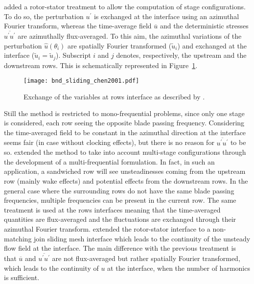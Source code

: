\citet{Chen2001} added a rotor-stator treatment
to allow the computation of stage configurations. 
To do so, the perturbation 
$u^\prime$ is exchanged at the interface using
an azimuthal Fourier transform, whereas
the time-average field $\overline{u}$ 
and the deterministic stresses 
$\overline{u^\prime u^\prime}$
are azimuthally flux-averaged.
To this aim, the azimuthal variations of 
the perturbation $\widehat{u} (\theta_i)$
are spatially Fourier transformed ($\widetilde{u}_i$)
and exchanged at the interface 
($\widetilde{u}_i = \widetilde{u}_j$). Subscript $i$ and $j$ denotes,
respectively, the upstream and the downstream rows.
This is schematically represented in 
Figure~\ref{fig:bnd_sliding_chen2001}.
\begin{figure}[htp]
  \centering
  \texttt{[image: bnd\_sliding\_chen2001.pdf]}
  \caption{Exchange of the variables at rows interface as described by \citet{Chen2001}.}
  \label{fig:bnd_sliding_chen2001}
\end{figure}

Still the method is restricted to mono-frequential problems, since only
one stage is considered, each row seeing the
opposite blade passing frequency. Considering
the time-averaged field to be constant in the azimuthal 
direction at the interface seems fair (in case 
without clocking effects), 
but there is
no reason for $\overline{u^\prime u^\prime}$ to be so.
\citet{He2002} extended the method to take into
account multi-stage configurations through the
development of a multi-frequential formulation.
In fact, in such an application, 
a sandwiched row will see unsteadinesses coming
from the upstream row (mainly wake effects) and
potential effects from the downstream rows. In the
general case where the surrounding rows do not have the
same blade passing frequencies, multiple frequencies
can be present in the current row.
The same treatment is used at the rows interfaces meaning
that the time-averaged quantities are flux-averaged and the
fluctuations are exchanged through their azimuthal
Fourier transform.
\citet{Vilmin2006} extended the rotor-stator
interface to a non-matching join sliding mesh interface which
leads to the continuity of the unsteady flow field at the interface.
The main difference with the previous treatment is that
$\overline{u}$ and $\overline{u^\prime u^\prime}$ 
are not flux-averaged but rather spatially Fourier transformed,
which leads to the continuity of $u$ at the interface, when
the number of harmonics is sufficient.

